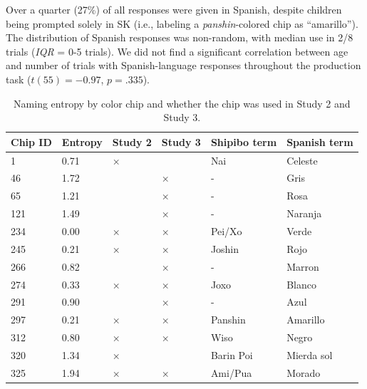 \documentclass[
  ,apa7,floatsintext]{apa6}
\begin{document}
Over a quarter (27\%) of all responses were given in Spanish, despite children being prompted solely in SK (i.e., labeling a \emph{panshin}-colored chip as ``amarillo''). The distribution of Spanish responses was non-random, with median use in 2/8 trials (\emph{IQR} = 0-5 trials). We did not find a significant correlation between age and number of trials with Spanish-language responses throughout the production task (\(t(55) = -0.97\), \(p = .335\)).

\begin{table}[tbp]

\begin{center}
\begin{threeparttable}

\caption{\label{tab:study1-entropy-table}Naming entropy by color chip and whether the chip was used in Study 2 and Study 3.}

\begin{tabular}{llllll}
\toprule
Chip ID & \multicolumn{1}{c}{Entropy} & \multicolumn{1}{c}{Study 2} & \multicolumn{1}{c}{Study 3} & \multicolumn{1}{c}{Shipibo term} & \multicolumn{1}{c}{Spanish term}\\
\midrule
1 & 0.71 & × &  & Nai & Celeste\\
46 & 1.72 &  & × & - & Gris\\
65 & 1.21 &  & × & - & Rosa\\
121 & 1.49 &  & × & - & Naranja\\
234 & 0.00 & × & × & Pei/Xo & Verde\\
245 & 0.21 & × & × & Joshin & Rojo\\
266 & 0.82 &  & × & - & Marron\\
274 & 0.33 & × & × & Joxo & Blanco\\
291 & 0.90 &  & × & - & Azul\\
297 & 0.21 & × & × & Panshin & Amarillo\\
312 & 0.80 & × & × & Wiso & Negro\\
320 & 1.34 & × &  & Barin Poi & Mierda sol\\
325 & 1.94 & × & × & Ami/Pua & Morado\\
\bottomrule
\end{tabular}

\end{threeparttable}
\end{center}

\end{table}
\end{document}
